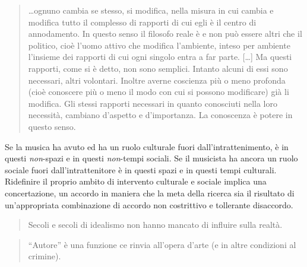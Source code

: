 \begin{quote}
  \ldots ognuno cambia se stesso, si modifica, nella misura in cui cambia e
  modifica tutto il complesso di rapporti di cui egli è il centro di annodamento.
  In questo senso il filosofo reale è e non può essere altri che il politico,
  cioè l'uomo attivo che modifica l'ambiente, inteso per ambiente l'insieme dei
  rapporti di cui ogni singolo entra a far parte. %
  [\ldots] Ma questi rapporti, come si è detto, non sono semplici. Intanto
  alcuni di essi sono necessari, altri volontari. Inoltre averne coscienza più
  o meno profonda (cioè conoscere più o meno il modo con cui si possono
  modificare) già li modifica. Gli stessi rapporti necessari in quanto
  conosciuti nella loro necessità, cambiano d'aspetto e d'importanza.
  La conoscenza è potere in questo senso. \cite{ag:matst}
\end{quote}%

Se la musica ha avuto ed ha un ruolo culturale fuori dall'intrattenimento, è
in questi \emph{non}-spazi e in questi \emph{non}-tempi sociali. Se il musicista
ha ancora un ruolo sociale fuori dall'intrattenitore è in questi spazi e in
questi tempi culturali. Ridefinire il proprio ambito di intervento culturale e
sociale implica una concertazione, un accordo in maniera che la meta della
ricerca sia il risultato di un’appropriata combinazione di accordo non
costrittivo e tollerante disaccordo.

\begin{quote}
  Secoli e secoli di idealismo non hanno mancato di influire sulla realtà. \cite{jlb:finzioni}
\end{quote}%

\begin{quote}
\begin{sf}
\small
  “Autore” è una funzione ce rinvia all'opera d'arte (e in altre condizioni al
  crimine).
  \cite{deleuze2009}
  \end{sf}
\end{quote}
